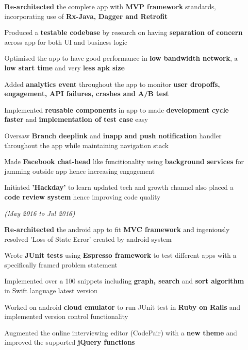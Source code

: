 \documentclass[a4paper]{deedy-resume} %
\begin{document}
\begin{tightitemize}
\item \textbf{Re-architected} the complete app with \textbf{MVP framework} standards, incorporating use of \textbf{Rx-Java, Dagger and Retrofit}
\item Produced a \textbf{testable codebase} by research on having \textbf{separation of concern} across app for both UI and business logic
\item Optimised the app to have good performance in \textbf{low bandwidth network}, a \textbf{low start time} and very \textbf{less apk size}
\item Added \textbf{analytics event} throughout the app to monitor \textbf{user dropoffs, engagement, API failures, crashes and A/B test}
\item Implemented \textbf{reusable components} in app to made \textbf{development cycle faster} and \textbf{implementation of test case} easy
\item  Oversaw \textbf{Branch deeplink} and \textbf{inapp and push notification} handler throughout the app while maintaining navigation stack
\item Made \textbf{Facebook chat-head} like funcitionality using \textbf{background services} for jamming outside app hence increasing engagement
\item Initiated \textbf{'Hackday'} to learn updated tech and growth channel also placed a \textbf{code review system} hence improving code quality
\end{tightitemize}
\microspace


\hfill {\textit{\small(May 2016 to Jul 2016)}}\\

\begin{tightitemize}
\item \textbf{Re-architected} the android app to fit \textbf{MVC framework} and ingeniously resolved 'Loss of State Error' created by android system
\item Wrote \textbf{JUnit tests} using \textbf{Espresso framework} to test different apps with a specifically framed problem statement
\item Implemented over a 100 snippets including  \textbf{ graph, search} and \textbf{sort algorithm} in Swift language latest version
\item Worked on android \textbf{cloud emulator} to run JUnit test in \textbf{Ruby on Rails} and implemented version control functionality
\item Augmented the online interviewing editor (CodePair) with a \textbf{new theme} and improved the supported \textbf{jQuery functions}
\end{tightitemize}
\microspace
\end{document}
